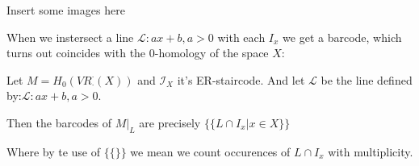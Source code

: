 {\color{red} Insert some images here}

When we instersect a line $\mathcal{L}:{ax+b,a>0}$ with each $I_x$ we get a 
barcode, which turns out coincides with the $0$-homology of the space $X$:

\begin{theorem}\cite{cai2020}
    Let $M=H_0(VR_\cdot^\cdot(X))$ 
    and $\mathcal{I}_X$ it's ER-staircode.
    And let $\mathcal{L}$ be the line defined by:$\mathcal{L}:{ax+b,a>0}$.

    Then the barcodes of $M\vert_L$ are precisely $\{\{
        L\cap I_x\vert x\in X
    \}\}$

    Where by te use of $\{\{\}\}$ we mean we count occurences of $L\cap I_x$ with multiplicity.
\end{theorem}
